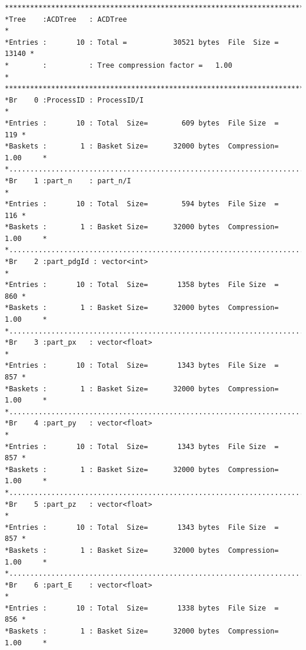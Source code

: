 {\scriptsize
\begin{verbatim}  
******************************************************************************
*Tree    :ACDTree   : ACDTree                                                *
*Entries :       10 : Total =           30521 bytes  File  Size =      13140 *
*        :          : Tree compression factor =   1.00                       *
******************************************************************************
*Br    0 :ProcessID : ProcessID/I                                            *
*Entries :       10 : Total  Size=        609 bytes  File Size  =        119 *
*Baskets :        1 : Basket Size=      32000 bytes  Compression=   1.00     *
*............................................................................*
*Br    1 :part_n    : part_n/I                                               *
*Entries :       10 : Total  Size=        594 bytes  File Size  =        116 *
*Baskets :        1 : Basket Size=      32000 bytes  Compression=   1.00     *
*............................................................................*
*Br    2 :part_pdgId : vector<int>                                           *
*Entries :       10 : Total  Size=       1358 bytes  File Size  =        860 *
*Baskets :        1 : Basket Size=      32000 bytes  Compression=   1.00     *
*............................................................................*
*Br    3 :part_px   : vector<float>                                          *
*Entries :       10 : Total  Size=       1343 bytes  File Size  =        857 *
*Baskets :        1 : Basket Size=      32000 bytes  Compression=   1.00     *
*............................................................................*
*Br    4 :part_py   : vector<float>                                          *
*Entries :       10 : Total  Size=       1343 bytes  File Size  =        857 *
*Baskets :        1 : Basket Size=      32000 bytes  Compression=   1.00     *
*............................................................................*
*Br    5 :part_pz   : vector<float>                                          *
*Entries :       10 : Total  Size=       1343 bytes  File Size  =        857 *
*Baskets :        1 : Basket Size=      32000 bytes  Compression=   1.00     *
*............................................................................*
*Br    6 :part_E    : vector<float>                                          *
*Entries :       10 : Total  Size=       1338 bytes  File Size  =        856 *
*Baskets :        1 : Basket Size=      32000 bytes  Compression=   1.00     *

\end{verbatim}}

